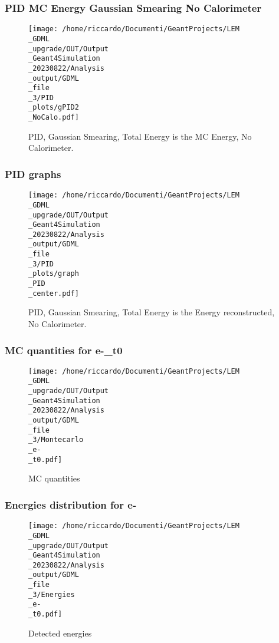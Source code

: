 \documentclass[8pt]{beamer}
\begin{document}
            \begin{frame}
                \frametitle{PID MC Energy Gaussian Smearing No Calorimeter}
            
        \begin{figure}[h]
            \centering
            \texttt{[image: /home/riccardo/Documenti/GeantProjects/LEM\\\_GDML\\\_upgrade/OUT/Output\\\_Geant4Simulation\\\_20230822/Analysis\\\_output/GDML\\\_file\\\_3/PID\\\_plots/gPID2\\\_NoCalo.pdf]}
            \caption{PID, Gaussian Smearing, Total Energy is the MC Energy, No Calorimeter.}
        \end{figure}
        
            \end{frame}
            
            \begin{frame}
                \frametitle{PID graphs}
            
        \begin{figure}[h]
            \centering
            \texttt{[image: /home/riccardo/Documenti/GeantProjects/LEM\\\_GDML\\\_upgrade/OUT/Output\\\_Geant4Simulation\\\_20230822/Analysis\\\_output/GDML\\\_file\\\_3/PID\\\_plots/graph\\\_PID\\\_center.pdf]}
            \caption{PID, Gaussian Smearing, Total Energy is the Energy reconstructed, No Calorimeter.}
        \end{figure}
        
            \end{frame}
            
            \begin{frame}
                \frametitle{MC quantities for e-\_t0}
            
        \begin{figure}[h]
            \centering
            \texttt{[image: /home/riccardo/Documenti/GeantProjects/LEM\\\_GDML\\\_upgrade/OUT/Output\\\_Geant4Simulation\\\_20230822/Analysis\\\_output/GDML\\\_file\\\_3/Montecarlo\\\_e-\\\_t0.pdf]}
            \caption{MC quantities}
        \end{figure}
        
            \end{frame}
            
            \begin{frame}
                \frametitle{Energies distribution for e-}
            
        \begin{figure}[h]
            \centering
            \texttt{[image: /home/riccardo/Documenti/GeantProjects/LEM\\\_GDML\\\_upgrade/OUT/Output\\\_Geant4Simulation\\\_20230822/Analysis\\\_output/GDML\\\_file\\\_3/Energies\\\_e-\\\_t0.pdf]}
            \caption{Detected energies}
        \end{figure}
        
            \end{frame}
            
\end{document}
